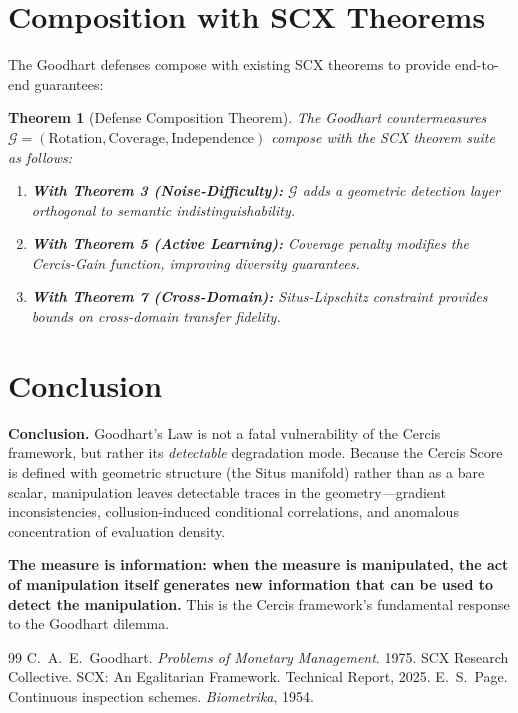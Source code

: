 \documentclass[11pt,a4paper]{article}
\theoremstyle{plain}
\newtheorem{theorem}{Theorem}[section]
\theoremstyle{definition}
\theoremstyle{remark}
\newcommand{\cG}{\mathcal{G}}
\begin{document}
\section{Composition with SCX Theorems}
\label{sec:composition}
The Goodhart defenses compose with existing SCX theorems to provide end-to-end guarantees:
\begin{theorem}[Defense Composition Theorem]\label{thm:composition}
  The Goodhart countermeasures \(\cG = (\text{Rotation}, \text{Coverage}, \text{Independence})\)
  compose with the SCX theorem suite as follows:
  \begin{enumerate}[label=(\roman*)]
    \item \textbf{With Theorem 3 (Noise-Difficulty):} \(\cG\) adds a geometric detection layer orthogonal to semantic indistinguishability.
    \item \textbf{With Theorem 5 (Active Learning):} Coverage penalty modifies the Cercis-Gain function, improving diversity guarantees.
    \item \textbf{With Theorem 7 (Cross-Domain):} Situs-Lipschitz constraint provides bounds on cross-domain transfer fidelity.
  \end{enumerate}
\end{theorem}

\section{Conclusion}
\label{sec:conclusion}
\noindent
\textbf{Conclusion.} Goodhart's Law is not a fatal vulnerability of the Cercis framework, but rather its \emph{detectable} degradation mode. Because the Cercis Score is defined with geometric structure (the Situs manifold) rather than as a bare scalar, manipulation leaves detectable traces in the geometry---gradient inconsistencies, collusion-induced conditional correlations, and anomalous concentration of evaluation density.

\textbf{The measure is information: when the measure is manipulated, the act of manipulation itself generates new information that can be used to detect the manipulation.} This is the Cercis framework's fundamental response to the Goodhart dilemma.

\begin{thebibliography}{99}
 C.~A.~E.~Goodhart. \emph{Problems of Monetary Management}. 1975.
 SCX Research Collective. SCX: An Egalitarian Framework. Technical Report, 2025.
 E.~S.~Page. Continuous inspection schemes. \emph{Biometrika}, 1954.
\end{thebibliography}
\end{document}
